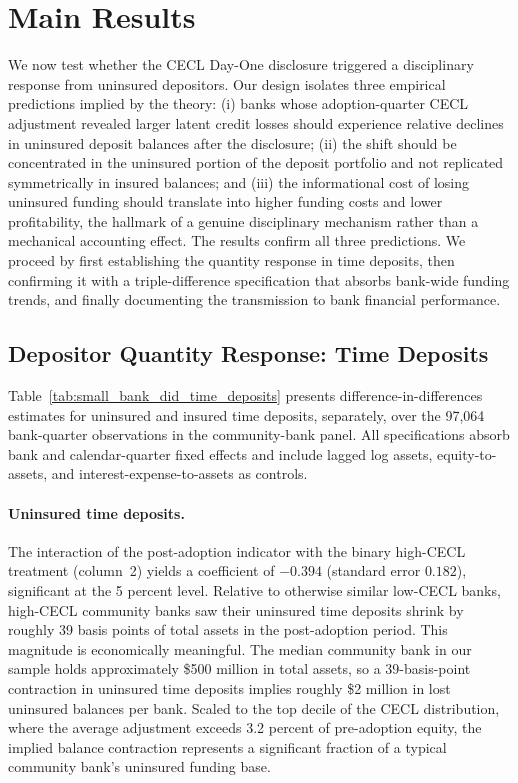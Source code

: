 
\section{Main Results}
\label{sec:results}

We now test whether the CECL Day-One disclosure triggered a disciplinary
response from uninsured depositors. Our design isolates three empirical
predictions implied by the theory: (i) banks whose adoption-quarter CECL
adjustment revealed larger latent credit losses should experience relative
declines in uninsured deposit balances after the disclosure; (ii) the shift
should be concentrated in the uninsured portion of the deposit portfolio and not
replicated symmetrically in insured balances; and (iii) the informational cost of
losing uninsured funding should translate into higher funding costs and lower
profitability, the hallmark of a genuine disciplinary mechanism rather than a
mechanical accounting effect. The results confirm all three predictions. We
proceed by first establishing the quantity response in time deposits, then
confirming it with a triple-difference specification that absorbs bank-wide
funding trends, and finally documenting the transmission to bank financial
performance.

\subsection{Depositor Quantity Response: Time Deposits}
\label{sec:results:time_deposits}

Table~\ref{tab:small_bank_did_time_deposits} presents difference-in-differences
estimates for uninsured and insured time deposits, separately, over the 97,064
bank-quarter observations in the community-bank panel. All specifications absorb
bank and calendar-quarter fixed effects and include lagged log assets,
equity-to-assets, and interest-expense-to-assets as controls.

\paragraph{Uninsured time deposits.}
The interaction of the post-adoption indicator with the binary high-CECL
treatment (column~2) yields a coefficient of $-0.394$ (standard error $0.182$),
significant at the 5 percent level. Relative to otherwise similar low-CECL
banks, high-CECL community banks saw their uninsured time deposits shrink by
roughly 39 basis points of total assets in the post-adoption period. This
magnitude is economically meaningful. The median community bank in our sample
holds approximately \$500 million in total assets, so a 39-basis-point
contraction in uninsured time deposits implies roughly \$2 million in lost
uninsured balances per bank. Scaled to the top decile of the CECL distribution,
where the average adjustment exceeds 3.2 percent of pre-adoption equity, the
implied balance contraction represents a significant fraction of a typical
community bank's uninsured funding base.

